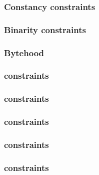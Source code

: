\subsubsection{Constancy constraints}                                                           \label{rom: generalities: constancies}                      
\subsubsection{Binarity constraints}                                                            \label{rom: generalities: binarities}                       
\subsubsection{Bytehood}                                                                        \label{rom: generalities: bytehood}                         
\subsubsection{\flagSum{} constraints}                                                          \label{rom: generalities: flag sum constraints}             
\subsubsection{\weightedFlagSum{} constraints}                                                  \label{rom: generalities: weighted flag sum constraints}    
\subsubsection{\romColumnCfiMax{} constraints}                                                  \label{rom: generalities: cfi max constraints}              
\subsubsection{\romColumnCfi{} constraints}                                                     \label{rom: generalities: cfi constraints}                  
\subsubsection{\done{} constraints}                                                             \label{rom: generalities: done constraints}                 
